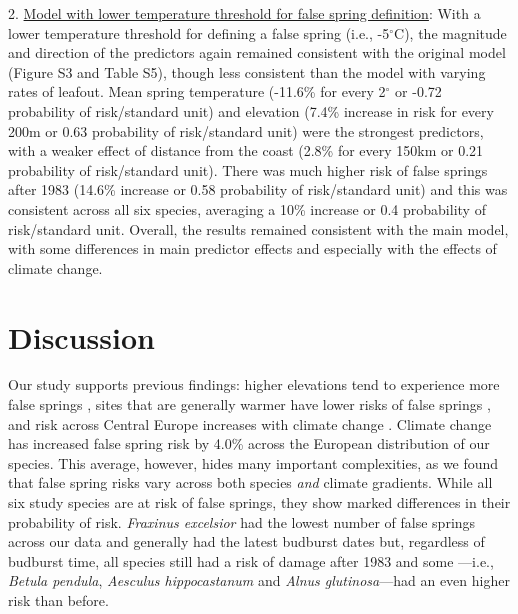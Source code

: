 \documentclass{article}\usepackage[]{graphicx}\usepackage[]{color}
\begin{document}
2. \underline{Model with lower temperature threshold for false spring definition}: With a lower temperature threshold for defining a false spring (i.e., -5$^{\circ}$C), the magnitude and direction of the predictors again remained consistent with the original model (Figure S3 and Table S5), though less consistent than the model with varying rates of leafout. Mean spring temperature (-11.6\% for every 2$^\circ$ or -0.72 probability of risk/standard unit) and elevation (7.4\% increase in risk for every 200m or 0.63 probability of risk/standard unit) were the strongest predictors, with a weaker effect of distance from the coast (2.8\% for every 150km or 0.21 probability of risk/standard unit). There was much higher risk of false springs after 1983 (14.6\% increase or 0.58 probability of risk/standard unit) and this was consistent across all six species, averaging a 10\% increase or 0.4 probability of risk/standard unit. Overall, the results remained consistent with the main model, with some differences in main predictor effects and especially with the effects of climate change.

\section*{Discussion}
Our study supports previous findings: higher elevations tend to experience more false springs \citep{Vitasse2018, Vitra2017}, sites that are generally warmer have lower risks of false springs \citep{Wypych2016}, and risk across Central Europe increases with climate change \citep{Liu2018}. Climate change has increased false spring risk by 4.0\% across the European distribution of our species. This average, however, hides many important complexities, as we found that false spring risks vary across both species \textit{and} climate gradients. While all six study species are at risk of false springs, they show marked differences in their probability of risk. \textit{Fraxinus excelsior} had the lowest number of false springs across our data and generally had the latest budburst dates but, regardless of budburst time, all species still had a risk of damage after 1983 and some ---i.e., \textit{Betula pendula}, \textit{Aesculus hippocastanum} and \textit{Alnus glutinosa}---had an even higher risk than before.
\end{document}

